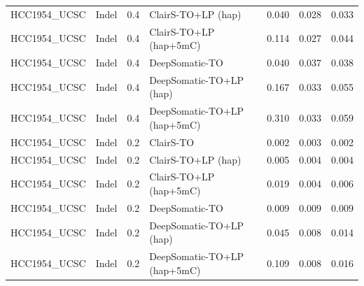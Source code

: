 \documentclass[pdflatex,sn-nature]{sn-jnl}
\begin{document}
{\begin{longtable}{@{}llllccc@{}}
  HCC1954\_UCSC & Indel & 0.4 & ClairS-TO+LP (hap) & 0.040 & 0.028 & 0.033 \\
  HCC1954\_UCSC & Indel & 0.4 & ClairS-TO+LP (hap+5mC) & 0.114 & 0.027 & 0.044 \\
  HCC1954\_UCSC & Indel & 0.4 & DeepSomatic-TO & 0.040 & 0.037 & 0.038 \\
  HCC1954\_UCSC & Indel & 0.4 & DeepSomatic-TO+LP (hap) & 0.167 & 0.033 & 0.055 \\
  HCC1954\_UCSC & Indel & 0.4 & DeepSomatic-TO+LP (hap+5mC) & 0.310 & 0.033 & 0.059 \\
  HCC1954\_UCSC & Indel & 0.2 & ClairS-TO & 0.002 & 0.003 & 0.002 \\
  HCC1954\_UCSC & Indel & 0.2 & ClairS-TO+LP (hap) & 0.005 & 0.004 & 0.004 \\
  HCC1954\_UCSC & Indel & 0.2 & ClairS-TO+LP (hap+5mC) & 0.019 & 0.004 & 0.006 \\
  HCC1954\_UCSC & Indel & 0.2 & DeepSomatic-TO & 0.009 & 0.009 & 0.009 \\
  HCC1954\_UCSC & Indel & 0.2 & DeepSomatic-TO+LP (hap) & 0.045 & 0.008 & 0.014 \\
  HCC1954\_UCSC & Indel & 0.2 & DeepSomatic-TO+LP (hap+5mC) & 0.109 & 0.008 & 0.016 \\
\end{longtable}
}
\end{document}
